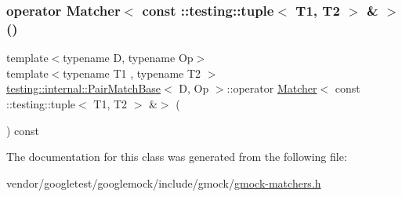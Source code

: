 \mbox{\label{classtesting_1_1internal_1_1_pair_match_base_a0482f7e530420faecf00b9fca059b694}} 
\subsubsection{\texorpdfstring{operator Matcher$<$ const \+::testing\+::tuple$<$ T1, T2 $>$ \& $>$()}{operator Matcher< const ::testing::tuple< T1, T2 > \& >()}}
{\footnotesize\ttfamily template$<$typename D, typename Op$>$ \\
template$<$typename T1 , typename T2 $>$ \\
\hyperlink{classtesting_1_1internal_1_1_pair_match_base}{testing\+::internal\+::\+Pair\+Match\+Base}$<$ D, Op $>$\+::operator \hyperlink{classtesting_1_1_matcher}{Matcher}$<$ const \+::testing\+::tuple$<$ T1, T2 $>$ \&$>$ (\begin{DoxyParamCaption}{ }\end{DoxyParamCaption}) const\hspace{0.3cm}{\ttfamily [inline]}}



The documentation for this class was generated from the following file\+:\begin{DoxyCompactItemize}
\item 
vendor/googletest/googlemock/include/gmock/\hyperlink{gmock-matchers_8h}{gmock-\/matchers.\+h}\end{DoxyCompactItemize}
